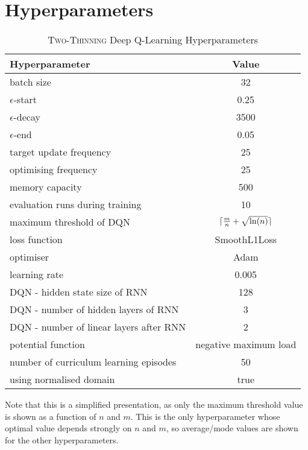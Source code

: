 
\chapter{Hyperparameters}\label{hyperparameters} 



\begin{table}[h!]\label{tab:two-thinning-hyperparameters}
\begin{threeparttable}
\caption{\textsc{Two-Thinning} Deep Q-Learning Hyperparameters}
\centering
\begin{tabular}{l|c}
\toprule
Hyperparameter             &     Value \\
\midrule
batch size               &     32 \\ 
$\epsilon$-start               &    0.25 \\ 
$\epsilon$-decay         &     3500\\
$\epsilon$-end              &     0.05 \\
target update frequency               &     25 \\ 
optimising frequency          &     25 \\ 
memory capacity     &     500 \\
evaluation runs during training             &     10 \\
maximum threshold of DQN             &     $\lceil\frac{m}{n}+\sqrt{\ln(n)}\rceil$ \\ 
loss function               &     SmoothL1Loss \\ 
optimiser        &     Adam \\
learning rate             &     0.005 \\
DQN - hidden state size of RNN               &     128 \\ 
DQN - number of hidden layers of RNN         &     3 \\ 
DQN - number of linear layers after RNN     &     2 \\
potential function            &    negative maximum load \\
number of curriculum learning episodes            & 50 \\ 
using normalised domain               &     true \\ 
\bottomrule
\end{tabular}
\begin{tablenotes}
      \small
      \item Note that this is a simplified presentation, as only the maximum threshold value is shown as a function of $n$ and $m$. This is the only hyperparameter whose optimal value depends strongly on $n$ and $m$, so average/mode values are shown for the other hyperparameters.
\end{tablenotes}
\end{threeparttable}
\end{table}





